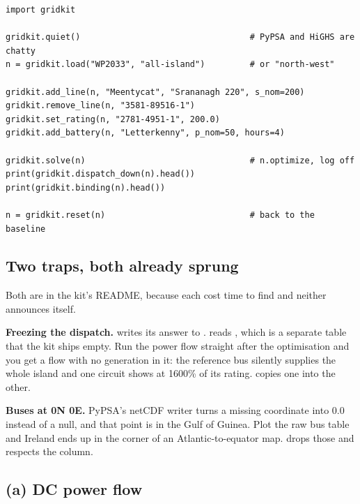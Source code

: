 \documentclass[11pt,a4paper]{article}
\begin{document}
\begin{lstlisting}
import gridkit

gridkit.quiet()                                  # PyPSA and HiGHS are chatty
n = gridkit.load("WP2033", "all-island")         # or "north-west"

gridkit.add_line(n, "Meentycat", "Srananagh 220", s_nom=200)
gridkit.remove_line(n, "3581-89516-1")
gridkit.set_rating(n, "2781-4951-1", 200.0)
gridkit.add_battery(n, "Letterkenny", p_nom=50, hours=4)

gridkit.solve(n)                                 # n.optimize, log off
print(gridkit.dispatch_down(n).head())
print(gridkit.binding(n).head())

n = gridkit.reset(n)                             # back to the baseline
\end{lstlisting}


\subsection{Two traps, both already sprung}

Both are in the kit's README, because each cost time to find and neither
announces itself.

\textbf{Freezing the dispatch.}  writes its answer to
.  reads , which
is a separate table that the kit ships empty. Run the power flow straight after
the optimisation and you get a flow with no generation in it: the reference bus
silently supplies the whole island and one circuit shows at 1600\% of its
rating.  copies one into the other.

\textbf{Buses at 0\textdegree{}N 0\textdegree{}E.} PyPSA's netCDF writer turns
a missing coordinate into 0.0 instead of a null, and that point is in the Gulf
of Guinea. Plot the raw bus table and Ireland ends up in the corner of an
Atlantic-to-equator map.  drops those and
respects the  column.

\clearpage
\subsection{(a) DC power flow}
\end{document}
